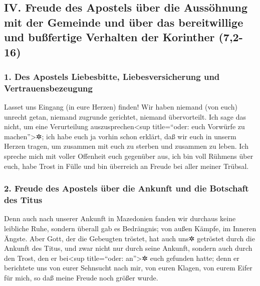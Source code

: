 \hypertarget{iv.-freude-des-apostels-uxfcber-die-aussuxf6hnung-mit-der-gemeinde-und-uxfcber-das-bereitwillige-und-buuxdffertige-verhalten-der-korinther-72-16}{%
\subsection{IV. Freude des Apostels über die Aussöhnung mit der Gemeinde
und über das bereitwillige und bußfertige Verhalten der Korinther
(7,2-16)}\label{iv.-freude-des-apostels-uxfcber-die-aussuxf6hnung-mit-der-gemeinde-und-uxfcber-das-bereitwillige-und-buuxdffertige-verhalten-der-korinther-72-16}}

\hypertarget{des-apostels-liebesbitte-liebesversicherung-und-vertrauensbezeugung}{%
\subsubsection{1. Des Apostels Liebesbitte, Liebesversicherung und
Vertrauensbezeugung}\label{des-apostels-liebesbitte-liebesversicherung-und-vertrauensbezeugung}}

 Lasset uns Eingang (in eure Herzen) finden! Wir haben
niemand (von euch) unrecht getan, niemand zugrunde gerichtet, niemand
übervorteilt.  Ich sage das nicht, um eine Verurteilung
auszusprechen\textless sup title=``oder: euch Vorwürfe zu
machen''\textgreater✲; ich habe euch ja vorhin schon erklärt, daß wir
euch in unserm Herzen tragen, um zusammen mit euch zu sterben und
zusammen zu leben.  Ich spreche mich mit voller Offenheit
euch gegenüber aus, ich bin voll Rühmens über euch, habe Trost in Fülle
und bin überreich an Freude bei aller meiner Trübsal.

\hypertarget{freude-des-apostels-uxfcber-die-ankunft-und-die-botschaft-des-titus}{%
\subsubsection{2. Freude des Apostels über die Ankunft und die Botschaft
des
Titus}\label{freude-des-apostels-uxfcber-die-ankunft-und-die-botschaft-des-titus}}

 Denn auch nach unserer Ankunft in Mazedonien fanden wir
durchaus keine leibliche Ruhe, sondern überall gab es Bedrängnis; von
außen Kämpfe, im Inneren Ängste.  Aber Gott, der die
Gebeugten tröstet, hat auch uns✲ getröstet durch die Ankunft des Titus,
 und zwar nicht nur durch seine Ankunft, sondern auch
durch den Trost, den er bei\textless sup title=``oder: an''\textgreater✲
euch gefunden hatte; denn er berichtete uns von eurer Sehnsucht nach
mir, von euren Klagen, von eurem Eifer für mich, so daß meine Freude
noch größer wurde.

